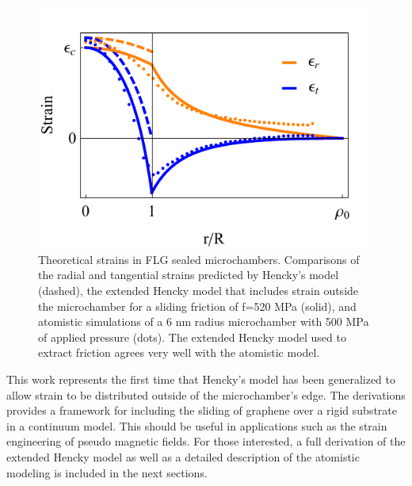 \begin{figure}
	\begin{center}
	\includegraphics{Figs_Friction/Figure_3.pdf}
	\end{center}
	\caption[Theoretical strains in FLG sealed microchambers]{\label{fig:fri:theory} Theoretical strains in FLG sealed microchambers. Comparisons of the radial and tangential strains predicted by Hencky's model (dashed), the extended Hencky model that includes strain outside the microchamber for a sliding friction of f=520 MPa (solid), and atomistic simulations of a 6 nm radius microchamber with 500 MPa of applied pressure (dots). The extended Hencky model used to extract friction agrees very well with the atomistic model.}
\end{figure}

This work represents the first time that Hencky's model has been generalized to allow strain to be distributed outside of the microchamber's edge.
The derivations provides a framework for including the sliding of graphene over a rigid substrate in a continuum model.
This should be useful in applications such as the strain engineering of pseudo magnetic fields.
For those interested, a full derivation of the extended Hencky model as well as a detailed description of the atomistic modeling is included in the next sections.

